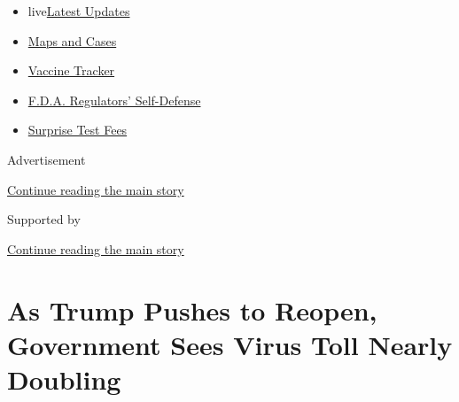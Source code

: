 \begin{itemize}
\tightlist
\item
  live\href{https://www.nytimes3xbfgragh.onion/2020/09/11/world/covid-19-coronavirus.html?name=styln-coronavirus-national\&region=TOP_BANNER\&block=storyline_menu_recirc\&action=click\&pgtype=Article\&impression_id=32030dd1-f4cf-11ea-b32a-256dc0696bd9\&variant=undefined}{Latest
  Updates}
\item
  \href{https://www.nytimes3xbfgragh.onion/interactive/2020/us/coronavirus-us-cases.html?name=styln-coronavirus-national\&region=TOP_BANNER\&block=storyline_menu_recirc\&action=click\&pgtype=Article\&impression_id=32030dd2-f4cf-11ea-b32a-256dc0696bd9\&variant=undefined}{Maps
  and Cases}
\item
  \href{https://www.nytimes3xbfgragh.onion/interactive/2020/science/coronavirus-vaccine-tracker.html?name=styln-coronavirus-national\&region=TOP_BANNER\&block=storyline_menu_recirc\&action=click\&pgtype=Article\&impression_id=32030dd3-f4cf-11ea-b32a-256dc0696bd9\&variant=undefined}{Vaccine
  Tracker}
\item
  \href{https://www.nytimes3xbfgragh.onion/2020/09/10/us/politics/fda-coronavirus-vaccine.html?name=styln-coronavirus-national\&region=TOP_BANNER\&block=storyline_menu_recirc\&action=click\&pgtype=Article\&impression_id=32030dd4-f4cf-11ea-b32a-256dc0696bd9\&variant=undefined}{F.D.A.
  Regulators' Self-Defense}
\item
  \href{https://www.nytimes3xbfgragh.onion/2020/09/09/upshot/coronavirus-surprise-test-fees.html?name=styln-coronavirus-national\&region=TOP_BANNER\&block=storyline_menu_recirc\&action=click\&pgtype=Article\&impression_id=32030dd5-f4cf-11ea-b32a-256dc0696bd9\&variant=undefined}{Surprise
  Test Fees}
\end{itemize}

Advertisement

\protect\hyperlink{after-top}{Continue reading the main story}

Supported by

\protect\hyperlink{after-sponsor}{Continue reading the main story}

\hypertarget{as-trump-pushes-to-reopen-government-sees-virus-toll-nearly-doubling}{%
\section{As Trump Pushes to Reopen, Government Sees Virus Toll Nearly
Doubling}\label{as-trump-pushes-to-reopen-government-sees-virus-toll-nearly-doubling}}


